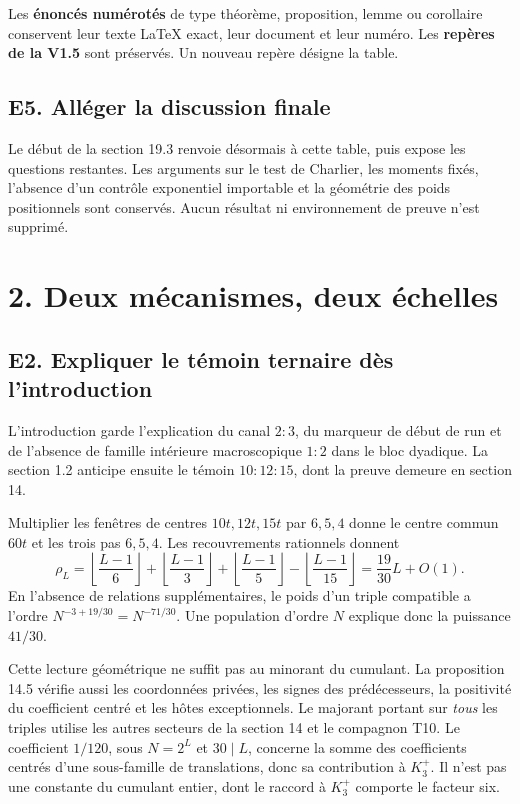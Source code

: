\documentclass[11pt,a4paper]{article}
\begin{document}
Les \textbf{\NumberedResultCount{} énoncés numérotés} de type théorème,
proposition, lemme ou corollaire conservent leur texte LaTeX exact,
leur document et leur numéro. Les \textbf{\PreservedLabelCount{} repères
de la V1.5} sont préservés. Un nouveau repère désigne la table.

\subsection*{E5. Alléger la discussion finale}
Le début de la section 19.3 renvoie désormais à cette table, puis expose
les questions restantes. Les arguments sur le test de Charlier, les
moments fixés, l'absence d'un contrôle exponentiel importable et la
géométrie des poids positionnels sont conservés. Aucun résultat ni
environnement de preuve n'est supprimé.

\clearpage
\section*{2. Deux mécanismes, deux échelles}
\subsection*{E2. Expliquer le témoin ternaire dès l'introduction}
L'introduction garde l'explication du canal \(2:3\), du marqueur de
début de run et de l'absence de famille intérieure macroscopique
\(1:2\) dans le bloc dyadique. La section 1.2 anticipe ensuite le témoin
\(10:12:15\), dont la preuve demeure en section 14.

Multiplier les fenêtres de centres \(10t,12t,15t\) par \(6,5,4\)
donne le centre commun \(60t\) et les trois pas \(6,5,4\).
Les recouvrements rationnels donnent
\[
 \rho_L=\left\lfloor\frac{L-1}{6}\right\rfloor
       +\left\lfloor\frac{L-1}{3}\right\rfloor
       +\left\lfloor\frac{L-1}{5}\right\rfloor
       -\left\lfloor\frac{L-1}{15}\right\rfloor
       =\frac{19}{30}L+O(1).
\]
En l'absence de relations supplémentaires, le poids d'un triple
compatible a l'ordre \(N^{-3+19/30}=N^{-71/30}\).
Une population d'ordre \(N\) explique donc la puissance \(41/30\).

Cette lecture géométrique ne suffit pas au minorant du cumulant.
La proposition 14.5 vérifie aussi les coordonnées privées, les signes
des prédécesseurs, la positivité du coefficient centré et les hôtes
exceptionnels. Le majorant portant sur \emph{tous} les triples utilise
les autres secteurs de la section 14 et le compagnon T10.
Le coefficient \(1/120\), sous \(N=2^L\) et \(30\mid L\), concerne
la somme des coefficients centrés d'une sous-famille de translations,
donc sa contribution à \(K_3^+\). Il n'est pas une constante du
cumulant entier, dont le raccord à \(K_3^+\) comporte le facteur six.
\end{document}
